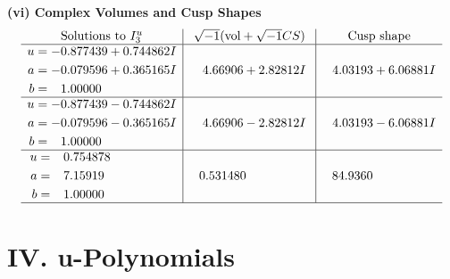 \documentclass[1p]{elsarticle_modified}
\theoremstyle{definition}
\newcommand{\I}{\sqrt{-1}}
\begin{document}
\newpage\flushleft \textbf{(vi) Complex Volumes and Cusp Shapes}
$$\begin{array}{c|c|c}  
\text{Solutions to }I^u_{3}& \I (\text{vol} + \sqrt{-1}CS) & \text{Cusp shape}\\
 \hline 
\begin{aligned}
u &= -0.877439 + 0.744862 I \\
a &= -0.079596 + 0.365165 I \\
b &= \phantom{-}1.00000\phantom{ +0.000000I}\end{aligned}
 & \phantom{-}4.66906 + 2.82812 I & \phantom{-}4.03193 + 6.06881 I \\ \hline\begin{aligned}
u &= -0.877439 - 0.744862 I \\
a &= -0.079596 - 0.365165 I \\
b &= \phantom{-}1.00000\phantom{ +0.000000I}\end{aligned}
 & \phantom{-}4.66906 - 2.82812 I & \phantom{-}4.03193 - 6.06881 I \\ \hline\begin{aligned}
u &= \phantom{-}0.754878\phantom{ +0.000000I} \\
a &= \phantom{-}7.15919\phantom{ +0.000000I} \\
b &= \phantom{-}1.00000\phantom{ +0.000000I}\end{aligned}
 & \phantom{-}0.531480\phantom{ +0.000000I} & \phantom{-}84.9360\phantom{ +0.000000I}\\
 \hline 
 \end{array}$$\newpage
\newpage\renewcommand{\arraystretch}{1}
\centering \section*{ IV. u-Polynomials}
\end{document}
